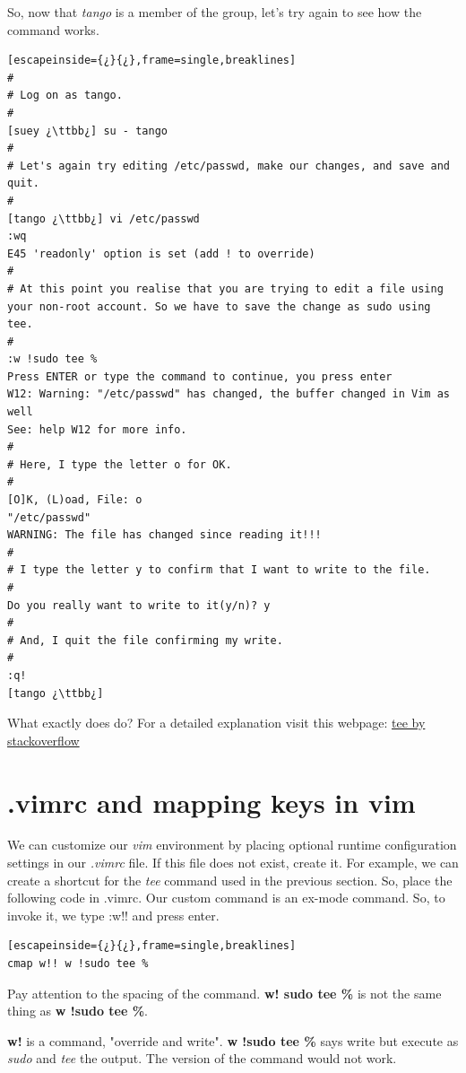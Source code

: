 So, now that \emph{tango} is a member of the  group, let's try again to see how the  command works.

\begin{lstlisting}[escapeinside={¿}{¿},frame=single,breaklines]
#
# Log on as tango.
#
[suey ¿\ttbb¿] su - tango
#
# Let's again try editing /etc/passwd, make our changes, and save and quit.
#
[tango ¿\ttbb¿] vi /etc/passwd
:wq
E45 'readonly' option is set (add ! to override)
#
# At this point you realise that you are trying to edit a file using your non-root account. So we have to save the change as sudo using tee.
#
:w !sudo tee %
Press ENTER or type the command to continue, you press enter
W12: Warning: "/etc/passwd" has changed, the buffer changed in Vim as well
See: help W12 for more info.
#
# Here, I type the letter o for OK.
#
[O]K, (L)oad, File: o
"/etc/passwd"
WARNING: The file has changed since reading it!!!
#
# I type the letter y to confirm that I want to write to the file.
#
Do you really want to write to it(y/n)? y
#
# And, I quit the file confirming my write.
#
:q!
[tango ¿\ttbb¿]
\end{lstlisting}

What exactly does  do? For a detailed explanation visit this webpage: \href{http://stackoverflow.com/questions/2600783/how-does-the-vim-write-with-sudo-trick-work}{tee by stackoverflow}

\section{.vimrc and mapping keys in vim}

We can customize our \emph{vim} environment by placing optional runtime configuration settings in our \textsl{\ttb.vimrc} file. If this file does not exist, create it. For example, we can create a shortcut for the \emph{tee} command used in the previous section. So, place the following code in \ttb.vimrc. Our custom command is an ex-mode command. So, to invoke it, we type :w!! and press enter.

\begin{lstlisting}[escapeinside={¿}{¿},frame=single,breaklines]
cmap w!! w !sudo tee %
\end{lstlisting}

Pay attention to the spacing of the command. \textbf{w! sudo tee \%} is not the same thing as \textbf{w !sudo tee \%}.

\textbf{ w!} is a command, "override and write". \textbf{w !sudo tee \%} says write but execute as \emph{sudo} and \emph{tee} the output. The  version of the command would not work.

